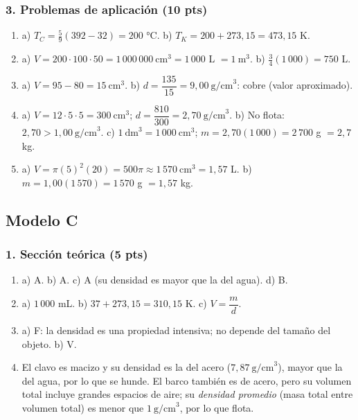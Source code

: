 \documentclass[12pt, letterpaper]{article}
\begin{document}
\subsubsection*{3. Problemas de aplicación (10 pts)}
\begin{enumerate}[leftmargin=*, label=\textbf{\arabic*.}, itemsep=0.35em]
  \item a) $T_C=\frac{5}{9}(392-32)=200$ °C. \quad
        b) $T_K=200+273{,}15=473{,}15$ K.
  \item a) $V=200\cdot100\cdot50=1\,000\,000\ \text{cm}^3=1\,000$ L $=1\ \text{m}^3$. \quad
        b) $\frac{3}{4}(1\,000)=750$ L.
  \item a) $V=95-80=15\ \text{cm}^3$. \quad
        b) $d=\dfrac{135}{15}=9{,}00\ \text{g/cm}^3$: cobre (valor aproximado).
  \item a) $V=12\cdot5\cdot5=300\ \text{cm}^3$;
        $d=\dfrac{810}{300}=2{,}70\ \text{g/cm}^3$. \quad
        b) No flota: $2{,}70>1{,}00\ \text{g/cm}^3$. \quad
        c) $1\ \text{dm}^3=1\,000\ \text{cm}^3$; $m=2{,}70(1\,000)=2\,700$ g $=2{,}7$ kg.
  \item a) $V=\pi(5)^2(20)=500\pi\approx1\,570\ \text{cm}^3=1{,}57$ L. \quad
        b) $m=1{,}00(1\,570)=1\,570$ g $=1{,}57$ kg.
\end{enumerate}

\subsection*{Modelo C}

\subsubsection*{1. Sección teórica (5 pts)}
\begin{enumerate}[leftmargin=*, label=\textbf{\arabic*.}, itemsep=0.35em]
  \item a) A. \quad b) A. \quad
        c) A (su densidad es mayor que la del agua). \quad d) B.
  \item a) $1\,000$ mL. \quad b) $37+273{,}15=310{,}15$ K. \quad
        c) $V=\dfrac{m}{d}$.
  \item a) F: la densidad es una propiedad intensiva; no depende del tamaño
        del objeto. \quad b) V.
  \item El clavo es macizo y su densidad es la del acero
        ($7{,}87\ \text{g/cm}^3$), mayor que la del agua, por lo que se hunde.
        El barco también es de acero, pero su volumen total incluye grandes
        espacios de aire; su \emph{densidad promedio} (masa total entre volumen
        total) es menor que $1\ \text{g/cm}^3$, por lo que flota.
\end{enumerate}
\end{document}

